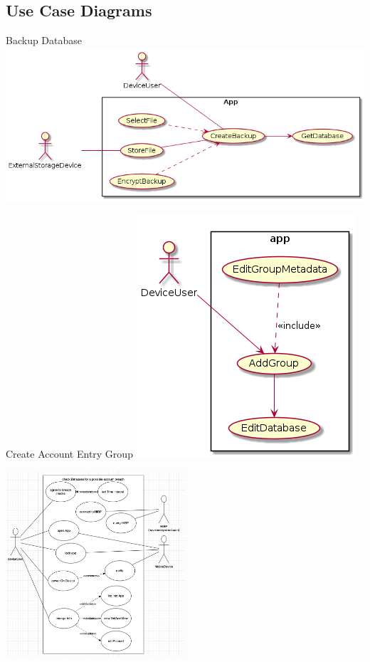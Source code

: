 \documentclass[stu]{apa7}
\begin{document}
{{{{\subsection{Use Case Diagrams}

Backup Database
\includegraphics[scale=0.5]{diag/gt/uc1.png}

Create Account Entry Group
\includegraphics[scale=0.5]{diag/gt/uc2.png}

\includegraphics[width=0.5\textwidth]{diag/rjm/uc1.png}

}}}}
\end{document}
